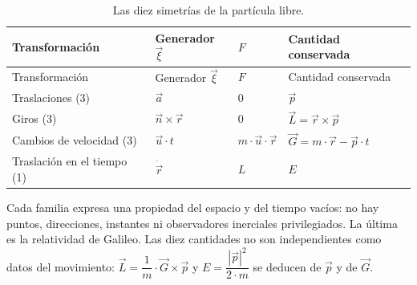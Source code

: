 \documentclass[11pt,a4paper,spanish]{book}
\begin{document}
\begin{longtable}[]{@{}
  >{\raggedright\arraybackslash}p{}
  >{\raggedright\arraybackslash}p{}
  >{\raggedright\arraybackslash}p{}
  >{\raggedright\arraybackslash}p{}@{}}
\caption{Las diez simetrías de la partícula libre.}\tabularnewline
\toprule\noalign{}
\begin{minipage}[b]{\linewidth}\raggedright
Transformación
\end{minipage} & \begin{minipage}[b]{\linewidth}\raggedright
Generador \(\vec{\xi}\)
\end{minipage} & \begin{minipage}[b]{\linewidth}\raggedright
\(F\)
\end{minipage} & \begin{minipage}[b]{\linewidth}\raggedright
Cantidad conservada
\end{minipage} \\
\midrule\noalign{}
\endfirsthead
\toprule\noalign{}
\begin{minipage}[b]{\linewidth}\raggedright
Transformación
\end{minipage} & \begin{minipage}[b]{\linewidth}\raggedright
Generador \(\vec{\xi}\)
\end{minipage} & \begin{minipage}[b]{\linewidth}\raggedright
\(F\)
\end{minipage} & \begin{minipage}[b]{\linewidth}\raggedright
Cantidad conservada
\end{minipage} \\
\midrule\noalign{}
\endhead
\bottomrule\noalign{}
\endlastfoot
Traslaciones (3) & \(\vec{a}\) & \(0\) & \(\vec{p}\) \\
Giros (3) & \(\vec{n} \times \vec{r}\) & \(0\) &
\(\vec{L} = \vec{r} \times \vec{p}\) \\
Cambios de velocidad (3) & \(\vec{u} \cdot t\) &
\(m \cdot \vec{u} \cdot \vec{r}\) &
\(\vec{G} = m \cdot \vec{r} - \vec{p} \cdot t\) \\
Traslación en el tiempo (1) & \(\dot{\vec{r}}\) & \(L\) & \(E\) \\
\end{longtable}

Cada familia expresa una propiedad del espacio y del tiempo vacíos: no
hay puntos, direcciones, instantes ni observadores inerciales
privilegiados. La última es la relatividad de Galileo. Las diez
cantidades no son independientes como datos del movimiento:
\(\vec{L} = \dfrac{1}{m} \cdot \vec{G} \times \vec{p}\) y
\(E = \dfrac{|\vec{p}|^2}{2 \cdot m}\) se deducen de \(\vec{p}\) y de
\(\vec{G}\).
\end{document}
